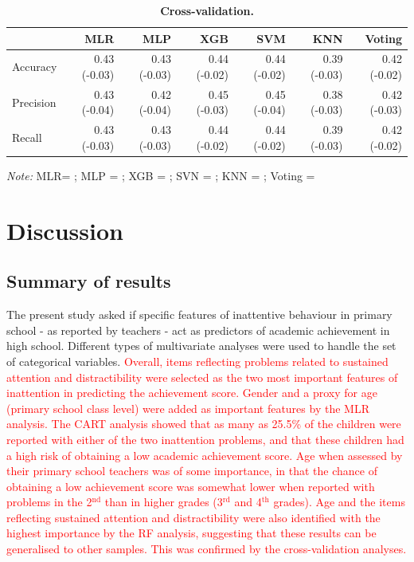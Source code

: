 \documentclass[10pt,letterpaper]{article}
\begin{document}
{{\begin{table}[!ht]
\begin{adjustwidth}{-7mm}{0in} %
\centering
\caption{\bf Cross-validation.} 
\vspace{5mm}
\begin{tabular}{|lrrrrrr|}
\hline
 & MLR & MLP & XGB & SVM & KNN & Voting\\\hline
 Accuracy &0.43 (-0.03) & 0.43 (-0.03) &0.44 (-0.02) &0.44 (-0.02) & 0.39 (-0.03) & 0.42 (-0.02)\\
 Precision & 0.43 (-0.04) & 0.42 (-0.04) & 0.45 (-0.03) & 0.45 (-0.04) & 0.38 (-0.03) & 0.42 (-0.03)\\
 Recall & 0.43 (-0.03) & 0.43 (-0.03) & 0.44 (-0.02) & 0.44 (-0.02) & 0.39 (-0.03) & 0.42 (-0.02) \\
 \hline
\end{tabular} 
\label{crossvalidation}
\end{adjustwidth}
\vspace{2mm}

\textit{Note:} MLR= ; MLP = ; XGB = ; SVN = ; KNN = ; Voting =  \\ 

\end{table}

\section*{Discussion}
\subsection*{Summary of results}
The present study asked if specific features of inattentive behaviour in primary school - as reported by teachers - act as predictors of academic achievement in high school. Different types of multivariate analyses were used to handle the set of categorical variables.  \textcolor{red}{Overall, items reflecting problems related to sustained attention and distractibility were selected as the two most important features of inattention in predicting the achievement score. Gender and a proxy for age (primary school class level) were added as important features by the MLR analysis. The CART analysis showed that as many as 25.5\% of the children were reported with either of the two inattention problems, and that these children had a high risk of obtaining a low academic achievement score. Age  when assessed by their primary school teachers was of some importance, in that the chance of obtaining a low achievement score was somewhat lower when reported with problems in the  2$^{\text{nd}}$ than in higher grades (3$^{\text{rd}}$ and 4$^{\text{th}}$  grades). Age and the items reflecting sustained attention and distractibility were also identified with the highest importance by the RF analysis, suggesting that these results can be generalised to other samples. This was confirmed by the cross-validation analyses.}\\

}}
\end{document}

